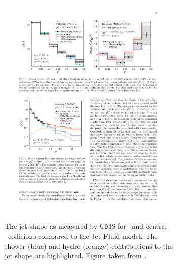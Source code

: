 \begin{figure}
\begin{subfigure}{.45\textwidth}
  \centering
\includegraphics[width=0.95\textwidth]{figures/jetMeasurements/JF_jetShape}
\caption{The jet shape as measured by CMS for \pp\ and central \pbpb\ collisions \cite{Chatrchyan:2013kwa} compared to the Jet Fluid model. The shower (blue) and hydro (orange) contributions to the jet shape are highlighted. Figure taken from \cite{Tachibana:2017syd}.}
\label{fig:jf_jetshape}
\end{subfigure} \qquad
\begin{subfigure}{.45\textwidth}
  \centering

\end{subfigure}
\end{figure}
